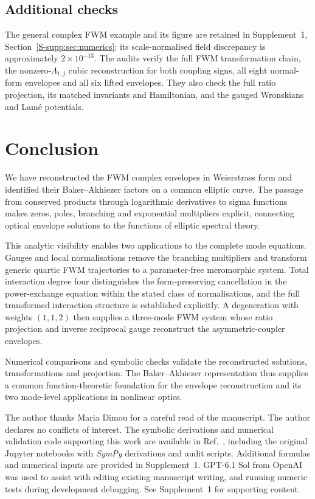 \documentclass{optica-article}
\numberwithin{equation}{section}
\begin{document}
\subsection{Additional checks}
The general complex FWM example and its figure are retained in Supplement~1, Section~\ref*{S-supp:sec:numerics}; its scale-normalised field discrepancy is approximately $2\times10^{-13}$.
The audits verify the full FWM transformation chain, the nonzero-$\Lambda_{1,j}$ cubic reconstruction for both coupling signs, all eight normal-form envelopes and all six lifted envelopes.
They also check the full ratio projection, its matched invariants and Hamiltonian, and the gauged Wronskians and Lam\'e potentials.

\FloatBarrier
\section{Conclusion}
We have reconstructed the FWM complex envelopes in Weierstrass form and identified their Baker--Akhiezer factors on a common elliptic curve.
The passage from conserved products through logarithmic derivatives to sigma functions makes zeros, poles, branching and exponential multipliers explicit, connecting optical envelope solutions to the functions of elliptic spectral theory.

This analytic visibility enables two applications to the complete mode equations.
Gauges and local normalisations remove the branching multipliers and transform generic quartic FWM trajectories to a parameter-free meromorphic system.
Total interaction degree four distinguishes the form-preserving cancellation in the power-exchange equation within the stated class of normalisations, and the full transformed interaction structure is established explicitly.
A degeneration with weights $(1,1,2)$ then supplies a three-mode FWM system whose ratio projection and inverse reciprocal gauge reconstruct the asymmetric-coupler envelopes.

Numerical comparisons and symbolic checks validate the reconstructed solutions, transformations and projection.
The Baker--Akhiezer representation thus supplies a common function-theoretic foundation for the envelope reconstruction and its two mode-level applications in nonlinear optics.

\begin{backmatter}
 The author thanks Maria Dimou for a careful read of the manuscript.
 The author declares no conflicts of interest.
 The symbolic derivations and numerical validation code supporting this work are available in Ref.~\cite{heskethFWMAndCouplerPaper}, including the original Jupyter notebooks with \emph{SymPy} derivations \cite{meurerSymPySymbolicComputing2017} and audit scripts. Additional formulas and numerical inputs are provided in Supplement~1.
 GPT-6.1 Sol from OpenAI was used to assist with editing existing manuscript writing, and running numeric tests during development debugging.
 See Supplement~1 for supporting content.
\end{backmatter}


\end{document}
